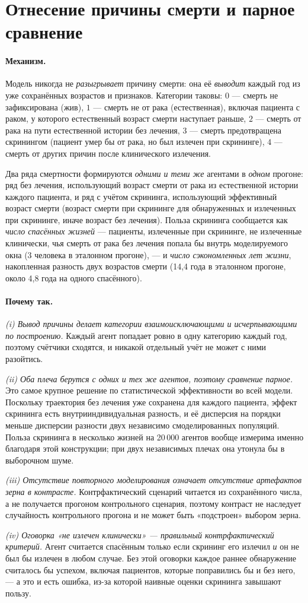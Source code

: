 \documentclass[12pt,a4paper]{article}
\newcommand{\mech}[1]{\paragraph{Механизм.} #1}
\newcommand{\why}[1]{\paragraph{Почему так.} #1}
\begin{document}
\section{Отнесение причины смерти и парное сравнение}
\label{sec:death}

\mech{Модель никогда не \emph{разыгрывает} причину смерти: она её \emph{выводит} каждый год из уже
сохранённых возрастов и признаков. Категории таковы: $0$ --- смерть не зафиксирована (жив), $1$ --- смерть не
от рака (естественная), включая пациента с раком, у которого естественный возраст смерти наступает раньше,
$2$ --- смерть от рака на пути естественной истории без лечения, $3$ --- смерть предотвращена скринингом
(пациент умер бы от рака, но был излечен при скрининге), $4$ --- смерть от других причин после клинического
излечения.

Два ряда смертности формируются \emph{одними и теми же} агентами в \emph{одном} прогоне: ряд без лечения,
использующий возраст смерти от рака из естественной истории каждого пациента, и ряд с учётом скрининга,
использующий эффективный возраст смерти (возраст смерти при скрининге для обнаруженных и излеченных при
скрининге, иначе возраст без лечения). Польза скрининга сообщается как \emph{число спасённых жизней} ---
пациенты, излеченные при скрининге, не излеченные клинически, чья смерть от рака без лечения попала бы внутрь
моделируемого окна (3 человека в эталонном прогоне), --- и \emph{число сэкономленных лет жизни}, накопленная
разность двух возрастов смерти (14,4 года в эталонном прогоне, около 4,8 года на одного спасённого).}

\why{\emph{(i) Вывод причины делает категории взаимоисключающими и исчерпывающими по построению.} Каждый
агент попадает ровно в одну категорию каждый год, поэтому счётчики сходятся, и никакой отдельный учёт не
может с ними разойтись.

\emph{(ii) Оба плеча берутся с одних и тех же агентов, поэтому сравнение парное.} Это самое крупное решение по
статистической эффективности во всей модели. Поскольку траектория без лечения уже сохранена для каждого
пациента, эффект скрининга есть внутрииндивидуальная разность, и её дисперсия на порядки меньше дисперсии
разности двух независимо смоделированных популяций. Польза скрининга в несколько жизней на 20\,000 агентов
вообще измерима именно благодаря этой конструкции; при двух независимых плечах она утонула бы в выборочном
шуме.

\emph{(iii) Отсутствие повторного моделирования означает отсутствие артефактов зерна в контрасте.}
Контрфактический сценарий читается из сохранённого числа, а не получается прогоном контрольного сценария,
поэтому контраст не наследует случайность контрольного прогона и не может быть «подстроен» выбором зерна.

\emph{(iv) Оговорка «не излечен клинически» --- правильный контрфактический критерий.} Агент считается
спасённым только если скрининг его излечил \emph{и} он не был бы излечен в любом случае. Без этой оговорки
каждое раннее обнаружение считалось бы успехом, включая пациентов, которые поправились бы и без него, --- а
это и есть ошибка, из-за которой наивные оценки скрининга завышают пользу.}
\end{document}
